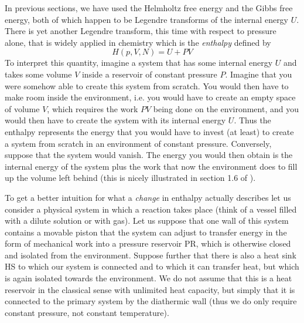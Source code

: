 \documentclass[a4paper, draft]{article}
\theoremstyle{own}
\theoremstyle{remark}
\begin{document}
In previous sections, we have used the Helmholtz free energy and the Gibbs free energy, both of which happen to be Legendre transforms of the internal energy $U$. There is yet another Legendre transform, this time with respect to pressure alone, that is widely applied in chemistry which is the {\em enthalpy} defined by
$$
H(p, V, N) = U + PV
$$
To interpret this quantity, imagine a system that has some internal energy $U$ and takes some volume $V$ inside a reservoir of constant pressure $P$. Imagine that you were somehow able to create this system from scratch. You would then have to make room inside the environment, i.e. you would have to create an empty space of volume $V$, which requires the work $PV$ being done on the environment, and you would then have to create the system with its internal energy $U$. Thus the enthalpy represents the energy that you would have to invest (at least) to create a system from scratch in an environment of constant pressure. Conversely, suppose that the system would vanish. The energy you would then obtain is the internal energy of the system plus the work that now the environment does to fill up the volume left behind (this is nicely illustrated in section 1.6 of \cite{Schroeder}).

To get a better intuition for what a {\em change} in enthalpy actually describes let us consider a physical system in which a reaction takes place (think of a vessel filled with a dilute solution or with gas). Let us suppose that one wall of this system contains a movable piston that the system can adjust to transfer energy in the form of mechanical work into a pressure reservoir PR, which is otherwise closed and isolated from the environment. Suppose further that there is also a heat sink HS to which our system is connected and to which it can transfer heat, but which is again isolated towards the environment. We do not assume that this is a heat reservoir in the classical sense with unlimited heat capacity, but simply that it is connected to the primary system by the diathermic wall (thus we do only require constant pressure, not constant temperature).
\end{document}
